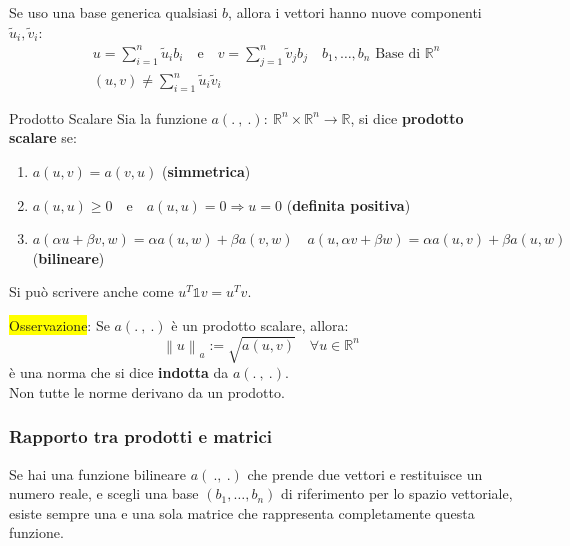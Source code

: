 \documentclass{article}
\begin{document}
Se uso una base generica qualsiasi $b$, allora i vettori hanno nuove componenti $\widetilde{u}_i,\widetilde{v}_i$:
\begin{align*}
     & u=\sum_{i=1}^{n}\widetilde{u}_ib_i\quad\text{e}\quad v=\sum_{j=1}^{n}\widetilde{v}_jb_j\quad b_1,\dots,b_n\text{ Base di }\mathbb R^n \\
     & \left(u,v\right)\ne \sum_{i=1}^{n}\widetilde{u}_i\widetilde{v}_i
\end{align*}

\begin{defi}{Prodotto Scalare}{}
    Sia la funzione $a\left(.\ ,\ .\right):\ \mathbb R^n\times\mathbb R^n\to\mathbb R$, si dice \textbf{prodotto scalare} se:\\
    \begin{enumerate}
        \item $a(u,v)=a(v,u)$ (\textbf{simmetrica})
        \item $a(u,u)\ge0\quad$e$\quad a(u,u)=0\Rightarrow u=0$ (\textbf{definita positiva})
        \item $a(\alpha u+\beta v,w)=\alpha a(u,w)+\beta a(v,w)\quad a(u,\alpha v+\beta w)=\alpha a(u,v)+\beta a(u,w)$ (\textbf{bilineare})
    \end{enumerate}

    Si può scrivere anche come $u^T\mathbb 1v=u^Tv$.
\end{defi}

\colorbox{yellow}{Osservazione}: Se $a\left(.\ ,\ .\right)$ è un prodotto scalare, allora:
\[\left\|u\right\|_a:=\sqrt{a(u,v)}\quad\forall u\in\mathbb R^n\]
è una norma che si dice \textbf{indotta} da $a\left(.\ ,\ .\right)$.\\
Non tutte le norme derivano da un prodotto.

\subsubsection{Rapporto tra prodotti e matrici}
Se hai una funzione bilineare $a(\ .,\ .)$ che prende due vettori e restituisce un numero reale,
e scegli una base $(b_1,\dots,b_n)$ di riferimento per lo spazio vettoriale, esiste sempre una e una sola matrice che rappresenta completamente questa funzione.
\end{document}
